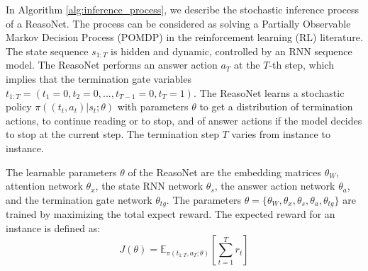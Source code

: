 \documentclass[sigconf]{acmart}
\begin{document}

In Algorithm \ref{alg:inference_process}, we describe the stochastic inference process of a ReasoNet. The process can be considered as solving a Partially Observable Markov Decision Process (POMDP) \citep{Kaelbling98planningand} in the reinforcement learning (RL) literature. The state sequence $s_{1:T}$ is hidden and dynamic, controlled by an RNN sequence model. The ReasoNet performs an answer action $a_T$ at the $T$-th step, which implies that the termination gate variables $t_{1:T} = (t_1 = 0, t_2 = 0, ..., t_{T-1} = 0, t_{T} = 1)$. The ReasoNet learns a stochastic policy $\pi( (t_t, a_t) | s_t; \theta)$ with parameters $\theta$ to get a distribution of termination actions, to continue reading or to stop, and of answer actions if the model decides to stop at the current step. The termination step $T$ varies from instance to instance.

The learnable parameters $\theta$ of the ReasoNet are the embedding matrices $\theta_W$, attention network $\theta_x$, the state RNN network $\theta_s$, the answer action network $\theta_a$, and the termination gate network $\theta_{tg}$. The parameters $\theta = \{\theta_W, \theta_x, \theta_s, \theta_a, \theta_{tg}\}$ are trained by maximizing the total expect reward. The expected reward for an instance is defined as:
\[ J(\theta) = \mathbb{E}_{\pi(t_{1:T}, a_T; \theta)} \left[ \sum_{t=1}^{T} r_t \right] \]
\end{document}
